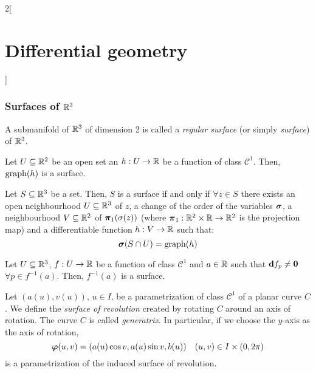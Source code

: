 \documentclass[../../../main_math.tex]{subfiles}
\begin{document}
\begin{multicols}{2}[\section{Differential geometry}]
  \subsubsection{Surfaces of \texorpdfstring{$\mathbb{R}^3$}{R3}}
  \begin{definition}
    A submanifold of $\mathbb{R}^3$ of dimension 2 is called a \emph{regular surface} (or simply \emph{surface}) of $\mathbb{R}^3$.
  \end{definition}
  \begin{proposition}
    Let $U\subseteq\mathbb{R}^2$ be an open set an $h:U\rightarrow\mathbb{R}$ be a function of class $\mathcal{C}^1$. Then, $\operatorname{graph} (h)$ is a surface.
  \end{proposition}
  \begin{proposition}
    Let $S\subseteq\mathbb{R}^3$ be a set. Then, $S$ is a surface if and only if $\forall z\in S$ there exists an open neighbourhood $U\subseteq \mathbb{R}^3$ of $z$, a change of the order of the variables $\boldsymbol{\mathrm{\sigma}}$, a neighbourhood $V\subseteq \mathbb{R}^2$ of $\boldsymbol{\mathrm{\pi}}_1(\sigma(z))$ (where $\boldsymbol{\mathrm{\pi}}_1:\mathbb{R}^2\times \mathbb{R}\rightarrow\mathbb{R}^2$ is the projection map) and a differentiable function $h:V\rightarrow \mathbb{R}$ such that: $$\boldsymbol{\mathrm{\sigma}}(S\cap U)=\operatorname{graph}(h)$$
  \end{proposition}
  \begin{proposition}
    Let $U\subseteq\mathbb{R}^3$, $f:U\rightarrow\mathbb{R}$ be a function of class $\mathcal{C}^1$ and $a\in\mathbb{R}$ such that $\boldsymbol{\mathrm{d}}f_p\ne\boldsymbol{\mathrm{0}}$ $\forall p\in f^{-1}(a)$. Then, $f^{-1}(a)$ is a surface.
  \end{proposition}
  \begin{definition}
    Let $(a(u),v(u))$, $u\in I$, be a parametrization of class $\mathcal{C}^1$ of a planar curve $C$. We define the \emph{surface of revolution} created by rotating $C$ around an axis of rotation. The curve $C$ is called \emph{generatrix}. In particular, if we choose the $y$-axis as the axis of rotation, $$\boldsymbol{\mathrm{\varphi}}(u,v)=(a(u)\cos v,a(u)\sin v,b(u))\quad (u,v)\in I\times (0,2\pi)$$
    is a parametrization of the induced surface of revolution.
  \end{definition}

\end{multicols}
\end{document}
